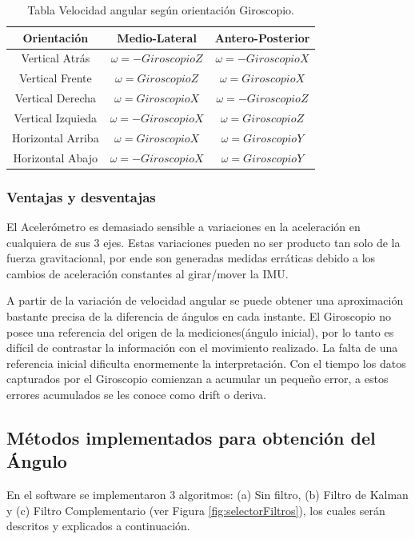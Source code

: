 \documentclass[12pt,a4paper]{article}
\begin{document}
\begin{table}[H]
	\centering
	\caption{Tabla Velocidad angular según orientación Giroscopio.} 
	\begin{tabular}{|c|c|c|}
		\hline 
		\textbf{Orientación} & \textbf{Medio-Lateral} & \textbf{Antero-Posterior} \\ 
		\hline 
		Vertical Atrás & $\omega= -GiroscopioZ$ &  $\omega= -GiroscopioX$ \\ 
		\hline 
		Vertical Frente & $\omega= GiroscopioZ$ &  $\omega= GiroscopioX$ \\
		\hline 
		Vertical Derecha & $\omega= GiroscopioX$ &  $\omega= -GiroscopioZ$ \\ 
		\hline 
		Vertical Izquieda & $\omega= -GiroscopioX$ &  $\omega= GiroscopioZ$ \\ 
		\hline 
		Horizontal Arriba & $\omega= GiroscopioX$ &  $\omega= GiroscopioY$ \\ 
		\hline 
		Horizontal Abajo & $\omega= -GiroscopioX$ &  $\omega= GiroscopioY$ \\ 
		\hline 
	\end{tabular}
	\label{table:calculoAnguloGiroscopio}
\end{table}



\subsubsection{Ventajas y desventajas}

El Acelerómetro es demasiado sensible a variaciones en la aceleración en cualquiera de sus 3 ejes. Estas variaciones pueden no ser producto tan solo de la fuerza gravitacional, por ende son generadas medidas erráticas debido a los cambios de aceleración constantes al girar/mover la IMU.

A partir de la variación de velocidad angular se puede obtener una aproximación bastante precisa de la diferencia de ángulos en cada instante.
El Giroscopio no posee una referencia del origen de la mediciones(ángulo inicial), por lo tanto es difícil de contrastar la información con el movimiento realizado.
La falta de una referencia inicial dificulta enormemente la interpretación. Con el tiempo los datos capturados por el Giroscopio comienzan a acumular un pequeño error, a estos errores acumulados se les conoce como drift o deriva.

\subsection{Métodos implementados para obtención del Ángulo}
En el software se implementaron 3 algoritmos: (a) Sin filtro, (b) Filtro de Kalman y (c) Filtro Complementario (ver Figura \ref{fig:selectorFiltros}), los cuales serán descritos y explicados a continuación.
	
\end{document}
